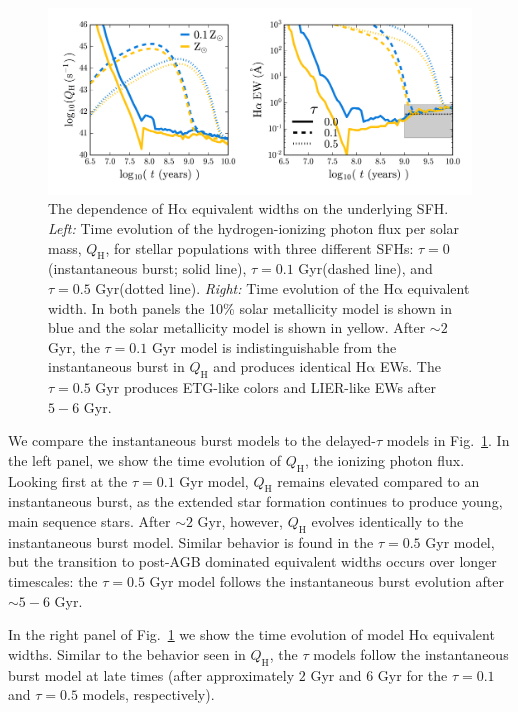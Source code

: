 \documentclass[preprint2]{aastex62}
\newcommand{\ha}{\ensuremath{\mathrm{H\alpha}}\xspace}
\newcommand{\QH}{\ensuremath{Q_{\mathrm{H}}}\xspace}
\newcommand{\Gyr}{$\,$Gyr\xspace}
\begin{document}
\begin{figure}
  \begin{center}
    \includegraphics[width=\linewidth]{figs/f6.png}
    \caption{{\sc The dependence of \ha equivalent widths on the underlying SFH.} \emph{Left:} Time evolution of the hydrogen-ionizing photon flux per solar mass, \QH, for stellar populations with three different SFHs: $\tau = 0$ (instantaneous burst; solid line), $\tau=0.1\,$\Gyr (dashed line), and $\tau=0.5\,$\Gyr (dotted line). \emph{Right:} Time evolution of the \ha equivalent width. In both panels the 10\% solar metallicity model is shown in blue and the solar metallicity model is shown in yellow. After ${\sim}2\,$\Gyr, the $\tau = 0.1\,$\Gyr model is indistinguishable from the instantaneous burst in \QH and produces identical \ha EWs. The $\tau = 0.5\,$\Gyr produces ETG-like colors and LIER-like EWs after $5-6\,$\Gyr.
    }
    \label{fig:tau}
  \end{center}
\end{figure}

We compare the instantaneous burst models to the delayed-$\tau$ models in Fig.~\ref{fig:tau}. In the left panel, we show the time evolution of \QH, the ionizing photon flux. Looking first at the $\tau=0.1\,$\Gyr model, \QH remains elevated compared to an instantaneous burst, as the extended star formation continues to produce young, main sequence stars. After ${\sim}2\,$\Gyr, however, \QH evolves identically to the instantaneous burst model. Similar behavior is found in the $\tau=0.5\,$\Gyr model, but the transition to post-AGB dominated equivalent widths occurs over longer timescales: the $\tau=0.5\,$\Gyr model follows the instantaneous burst evolution after ${\sim}5-6\,$\Gyr. 

In the right panel of Fig.~\ref{fig:tau} we show the time evolution of model \ha equivalent widths. Similar to the behavior seen in \QH, the $\tau$ models follow the instantaneous burst model at late times (after approximately $2\,$\Gyr and $6\,$\Gyr for the $\tau=0.1$ and $\tau=0.5$ models, respectively). 
\end{document}

